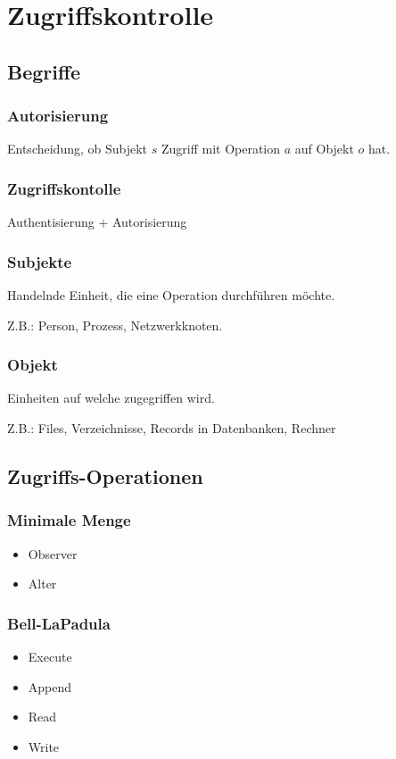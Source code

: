 \chapter{Zugriffskontrolle}
\section{Begriffe}
\subsection{Autorisierung}
Entscheidung, ob Subjekt $s$ Zugriff mit Operation $a$ auf Objekt $o$ hat.

\subsection{Zugriffskontolle}
Authentisierung + Autorisierung

\subsection{Subjekte}
Handelnde Einheit, die eine Operation durchführen möchte.

Z.B.: Person, Prozess, Netzwerkknoten.

\subsection{Objekt}
Einheiten auf welche zugegriffen wird.

Z.B.: Files, Verzeichnisse, Records in Datenbanken, Rechner

\section{Zugriffs-Operationen}
\subsection{Minimale Menge}
\begin{itemize}
    \item Observer
    \item Alter
\end{itemize}

\subsection{Bell-LaPadula}
\begin{itemize}
    \item Execute
    \item Append
    \item Read
    \item Write
\end{itemize}

